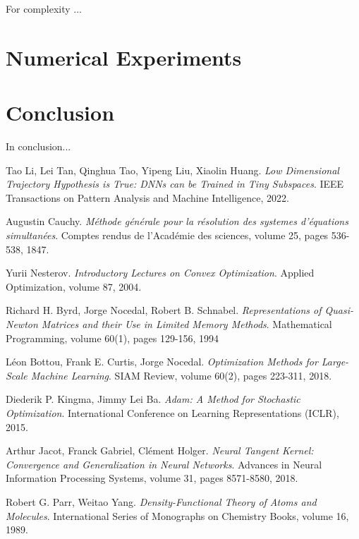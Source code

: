 \documentclass[11pt, a4paper]{article}
\begin{document}
For complexity ...

\pagebreak
\section{Numerical Experiments}

\pagebreak
\section{Conclusion}

In conclusion...

\pagebreak
\begin{thebibliography}{999}

 Tao Li, Lei Tan, Qinghua Tao, Yipeng Liu, Xiaolin Huang. \textit{Low Dimensional Trajectory Hypothesis is True: DNNs can be Trained in Tiny Subspaces}. IEEE Transactions on Pattern Analysis and Machine Intelligence, 2022.

 Augustin Cauchy. \textit{M\'{e}thode g\'{e}n\'{e}rale pour la r\'{e}solution des systemes d'\'{e}quations simultan\'{e}es}. Comptes rendus de l'Acad\'{e}mie des sciences, volume 25, pages 536-538, 1847.

 Yurii Nesterov. \textit{Introductory Lectures on Convex Optimization}. Applied Optimization, volume 87, 2004.

 Richard H. Byrd, Jorge Nocedal, Robert B. Schnabel. \textit{Representations of Quasi-Newton Matrices and their Use in Limited Memory Methods}. Mathematical Programming, volume 60(1), pages 129-156, 1994 

 L\'{e}on Bottou, Frank E. Curtis, Jorge Nocedal. \textit{Optimization Methods for Large-Scale Machine Learning}. SIAM Review, volume 60(2), pages 223-311, 2018.

 Diederik P. Kingma, Jimmy Lei Ba. \textit{Adam: A Method for Stochastic Optimization}. International Conference on Learning Representations (ICLR), 2015.

 Arthur Jacot, Franck Gabriel, Cl\'{e}ment Holger. \textit{Neural Tangent Kernel: Convergence and Generalization in Neural Networks}. Advances in Neural Information Processing Systems, volume 31, pages 8571-8580, 2018.

 Robert G. Parr, Weitao Yang. \textit{Density-Functional Theory of Atoms and Molecules}. International Series of Monographs on Chemistry Books, volume 16, 1989.


\end{thebibliography}
\end{document}
